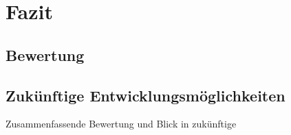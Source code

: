 \chapter{Fazit}

\section{Bewertung}
\section{Zukünftige Entwicklungsmöglichkeiten}

Zusammenfassende Bewertung und Blick in zukünftige
    